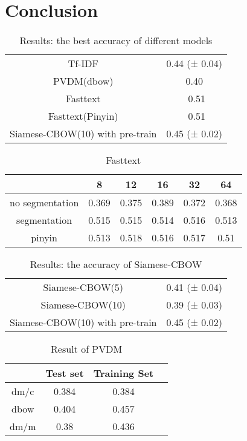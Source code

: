 \chapter{Conclusion}

\begin{table}[]
\centering
\caption{Results: the best accuracy of different models}
\label{resultAll}
\begin{tabular}{|c|c|}
\hline
Tf-IDF   & 0.44 (± 0.04) \\
PVDM(dbow) & 0.40    \\
Fasttext &  ~0.51   \\
Fasttext(Pinyin) &  ~0.51  \\
Siamese-CBOW(10) with pre-train & 0.45 (± 0.02) \\

\hline
\end{tabular}
\end{table}

\begin{table}[]
\centering
\caption{Fasttext}
\label{fasttext}
\begin{tabular}{|c|c|c|c|c|c|}
\hline
   & 8 & 12 & 16 & 32 & 64 \\
\hline
no segmentation  & 0.369 & 0.375 & 0.389 & 0.372 & 0.368 \\
segmentation  & 0.515 & 0.515 & 0.514 & 0.516 & 0.513 \\
pinyin  & 0.513 & 0.518 & 0.516 & 0.517 & 0.51 \\
\hline
\end{tabular}
\end{table}


\begin{table}[]
\centering
\caption{Results: the accuracy of Siamese-CBOW}
\label{resultSCBOW}
\begin{tabular}{|c|c|}
\hline
Siamese-CBOW(5) & 0.41 (± 0.04) \\
Siamese-CBOW(10) & 0.39 (± 0.03) \\
Siamese-CBOW(10) with pre-train & 0.45 (± 0.02) \\
\hline
\end{tabular}
\end{table}

\begin{table}[]
\centering
\caption{Result of PVDM}
\label{resultPVDM}
\begin{tabular}{|c|c|c|c|}
\hline
      & Test set & Training Set \\
\hline
dm/c  & 0.384 &  0.384 \\
dbow &  0.404  & 0.457 \\
dm/m &  0.38  & 0.436 \\
\hline
\end{tabular}
\end{table}


